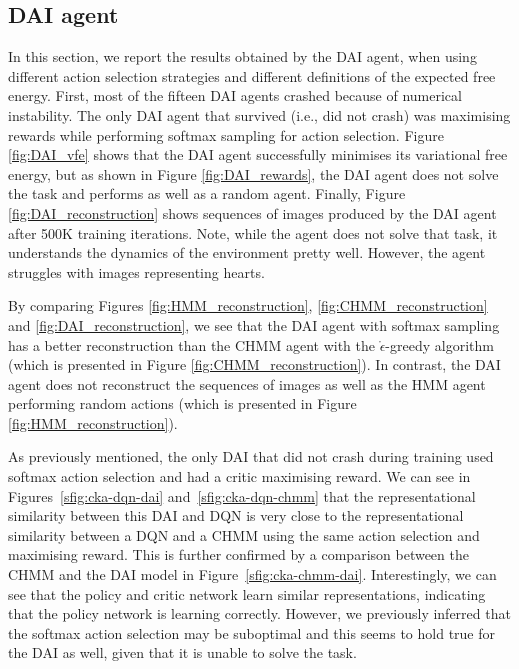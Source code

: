 \documentclass[twoside,11pt]{article}
\begin{document}

\subsection{DAI agent} \label{ssec:dai_results}

In this section, we report the results obtained by the DAI agent, when using different action selection strategies and different definitions of the expected free energy. First, most of the fifteen DAI agents crashed because of numerical instability. The only DAI agent that survived (i.e., did not crash) was maximising rewards while performing softmax sampling for action selection. Figure \ref{fig:DAI_vfe} shows that the DAI agent successfully minimises its variational free energy, but as shown in Figure \ref{fig:DAI_rewards}, the DAI agent does not solve the task and performs as well as a random agent. Finally, Figure \ref{fig:DAI_reconstruction} shows sequences of images produced by the DAI agent after 500K training iterations. Note, while the agent does not solve that task, it understands the dynamics of the environment pretty well. However, the agent struggles with images representing hearts.

By comparing Figures \ref{fig:HMM_reconstruction}, \ref{fig:CHMM_reconstruction} and \ref{fig:DAI_reconstruction}, we see that the DAI agent with softmax sampling has a better reconstruction than the CHMM agent with the $\mathring{\epsilon}$-greedy algorithm (which is presented in Figure \ref{fig:CHMM_reconstruction}). In contrast, the DAI agent does not reconstruct the sequences of images as well as the HMM agent performing random actions (which is presented in Figure \ref{fig:HMM_reconstruction}).

As previously mentioned, the only DAI that did not crash during training used softmax action selection and had a critic maximising reward. We can see in Figures~\ref{sfig:cka-dqn-dai} and~\ref{sfig:cka-dqn-chmm} that the representational similarity between this DAI and DQN is very close to the representational similarity between a DQN and a CHMM using the same action selection and maximising reward. This is further confirmed by a comparison between the CHMM and the DAI model in Figure~\ref{sfig:cka-chmm-dai}. Interestingly, we can see that the policy and critic network learn similar representations, indicating that the policy network is learning correctly. However, we previously inferred that the softmax action selection may be suboptimal and this seems to hold true for the DAI as well, given that it is unable to solve the task.
\end{document}
